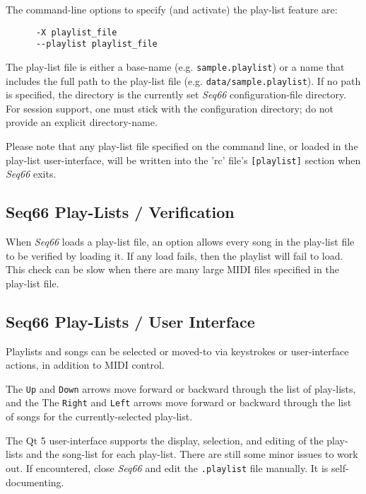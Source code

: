    The command-line options to specify (and activate) the play-list feature
   are:

   \begin{verbatim}
      -X playlist_file
      --playlist playlist_file
   \end{verbatim}

   The play-list file is either a base-name (e.g. \texttt{sample.playlist})
   or a name that includes the full path to the play-list file
   (e.g. \texttt{data/sample.playlist}).
   If no path is specified, the directory is the currently set
   \textsl{Seq66} configuration-file directory.
   For session support, one must stick with the configuration directory;
   do not provide an explicit directory-name.

   Please note that any play-list file specified on the command line, or loaded
   in the play-list user-interface,
   will be written into the 'rc' file's \texttt{[playlist]} section when
   \textsl{Seq66} exits.

\subsection{Seq66 Play-Lists / Verification}
\label{subsec:playlist_verify}

   When \textsl{Seq66} loads a play-list file, an option allows every
   song in the play-list file to be verified by loading it.  If any load fails,
   then the playlist will fail to load.  This check can be slow when there are
   many large MIDI files specified in the play-list file.

\subsection{Seq66 Play-Lists / User Interface}
\label{subsec:playlist_uis}

   Playlists and songs can be selected or moved-to via keystrokes or
   user-interface actions, in addition to MIDI control.

   The \texttt{Up} and \texttt{Down} arrows move forward or backward through
   the list of play-lists, and the
   The \texttt{Right} and \texttt{Left} arrows move forward or backward through
   the list of songs for the currently-selected play-list.

   The Qt 5 user-interface supports the display, selection, and editing of
   the play-lists and the song-list for each play-list.
   There are still some minor issues to work out.  If encountered, close
   \textsl{Seq66} and edit the \texttt{.playlist} file manually.
   It is self-documenting.

